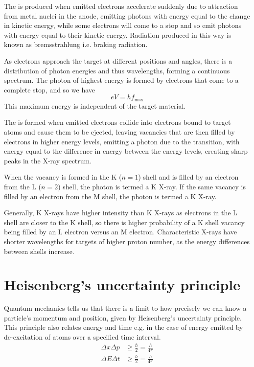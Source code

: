 \documentclass[Physics.tex]{subfiles}
\begin{document}
The  is produced when emitted electrons accelerate suddenly due to attraction from metal nuclei in the anode, emitting photons with energy equal to the change in kinetic energy, while some electrons will come to a stop and so emit photons with energy equal to their kinetic energy. Radiation produced in this way is known as bremsstrahlung i.e. braking radiation.

As electrons approach the target at different positions and angles, there is a distribution of photon energies and thus wavelengths, forming a continuous spectrum. The photon of highest energy is formed by electrons that come to a complete stop, and so we have \begin{equation}eV = hf_\text{max}\end{equation} This maximum energy is independent of the target material.

The  is formed when emitted electrons collide into electrons bound to target atoms and cause them to be ejected, leaving vacancies that are then filled by electrons in higher energy levels, emitting a photon due to the transition, with energy equal to the difference in energy between the energy levels, creating sharp peaks in the X-ray spectrum.

When the vacancy is formed in the K (\(n=1\)) shell and is filled by an electron from the L (\(n=2\)) shell, the photon is termed a K\textsubscript{\upalpha} X-ray. If the same vacancy is filled by an electron from the M shell, the photon is termed a K\textsubscript{\upbeta} X-ray.

Generally, K\textsubscript{\upalpha} X-rays have higher intensity than K\textsubscript{\upbeta} X-rays as electrons in the L shell are closer to the K shell, so there is higher probability of a K shell vacancy being filled by an L electron versus an M electron. Characteristic X-rays have shorter wavelengths for targets of higher proton number, as the energy differences between shells increase.
\section{Heisenberg's uncertainty principle}
Quantum mechanics tells us that there is a limit to how precisely we can know a particle's momentum and position, given by Heisenberg's uncertainty principle. This principle also relates energy and time e.g. in the case of energy emitted by de-excitation of atoms over a specified time interval. \begin{align}\Delta x\Delta p &\geq \frac{\hbar}{2} = \frac{h}{4\pi}\\\Delta E\Delta t &\geq \frac{\hbar}{2} = \frac{h}{4\pi}\end{align}
\end{document}
